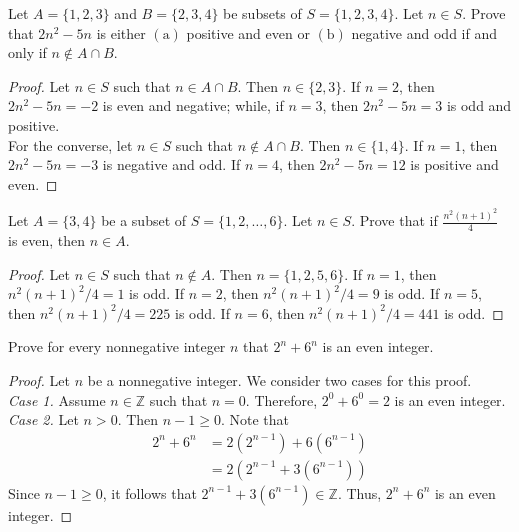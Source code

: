 \documentclass[12pt]{article}
\newcommand{\Z}{\mathbb{Z}}
\newenvironment{problem}[2][Problem]{\begin{trivlist}
		\item[\hskip \labelsep {\bfseries #1}\hskip \labelsep {\bfseries #2.}]}{\end{trivlist}}
\begin{document}
\begin{problem}{33}
	Let $A=\{1,2,3\}$ and $B=\{2,3,4\}$ be subsets of $S=\{1,2,3,4\}$. Let $n\in S$. Prove that $2n^{2}-5n$ is either $(\text{a})$ positive and even or $(\text{b})$ negative and odd if and only if $n\notin A\cap B$.
	\begin{proof}
		Let $n\in S$ such that $n\in A\cap B$. Then $n\in \{2,3\}$. If $n=2$, then $2n^{2}-5n=-2$ is even and negative; while, if $n=3$, then $2n^{2}-5n=3$ is odd and positive.\\
		For the converse, let $n\in S$ such that $n\notin A\cap B$. Then $n\in \{1,4\}$. If $n=1$, then $2n^{2}-5n=-3$ is negative and odd. If $n=4$, then $2n^{2}-5n=12$ is positive and even.
	\end{proof} 
\end{problem}

\begin{problem}{34}
	Let $A=\{3,4\}$ be a subset of $S=\{1,2,\ldots,6\}$. Let $n\in S$. Prove that if $\frac{n^{2}(n+1)^{2}}{4}$ is even, then $n\in A$.
	\begin{proof}
		Let $n\in S$ such that $n\notin A$. Then $n=\{1,2,5,6\}$. If $n=1$, then $n^{2}(n+1)^{2}/4=1$ is odd. If $n=2$, then $n^{2}(n+1)^{2}/4=9$ is odd. If $n=5$, then $n^{2}(n+1)^{2}/4=225$ is odd. If $n=6$, then $n^{2}(n+1)^{2}/4=441$ is odd. 
	\end{proof}
\end{problem}

\begin{problem}{35}
	Prove for every nonnegative integer $n$ that $2^{n}+6^{n}$ is an even integer.
	\begin{proof}
		Let $n$ be a nonnegative integer. We consider two cases for this proof.\\ 
		\textit{Case 1.} Assume $n\in \Z$ such that $n = 0$. Therefore, $2^{0}+6^{0}=2$ is an even integer.\\
		\textit{Case 2.} Let $n > 0$. Then $n-1 \geq 0$. Note that
		\begin{align*}
			2^{n}+6^{n} &= 2(2^{n-1})+ 6(6^{n-1})\\
						&= 2(2^{n-1} + 3(6^{n-1}))
		\end{align*}
	Since $n-1 \geq 0$, it follows that $2^{n-1} + 3(6^{n-1}) \in \Z$. Thus, $2^{n}+6^{n}$ is an even integer.
	\end{proof}
\end{problem}
\end{document}
